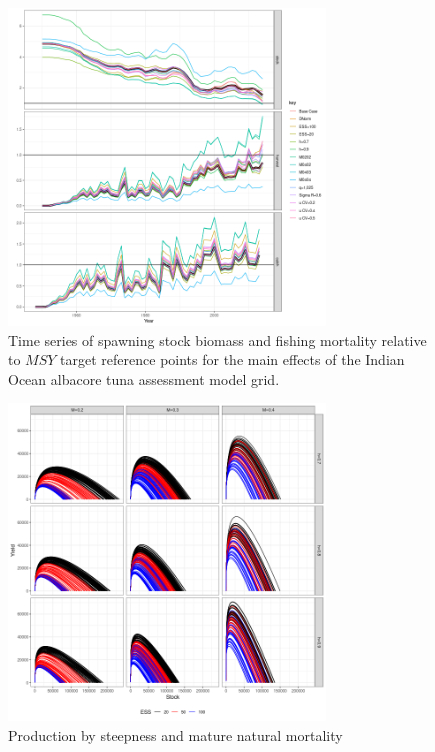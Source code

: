 \begin{figure}[ht!]\centering\includegraphics[width=0.75\textwidth]{figures/main-trends-1.png} \caption{Time series of spawning stock biomass and fishing mortality relative to $MSY$ target reference points for the main effects of the Indian Ocean albacore tuna assessment model grid.}
\label{fig:ts}
\end{figure}

\begin{figure}[ht!]\centering\includegraphics[width=0.75\textwidth]{figures/pf-grid-1.png} 
\caption{Production by steepness and mature natural mortality}
\label{fig:pf}       
\end{figure}

